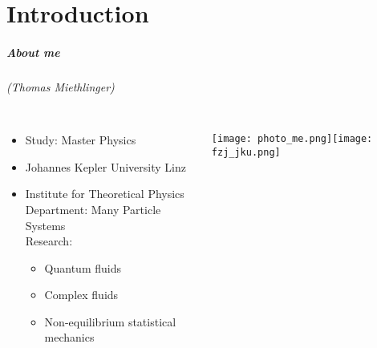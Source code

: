 








\part{Introduction}
\makepart

\begin{frame}
\frametitle{About me}
\framesubtitle{(Thomas Miethlinger)}
\begin{columns}[T]
 \begin{column}{.35\textwidth}
 \begin{itemize}
  \item Study: Master Physics
  \item Johannes Kepler University Linz
  \item Institute for Theoretical Physics \\ Department: Many Particle Systems \\
        Research:
        \begin{itemize}
         \item Quantum fluids
         \item Complex fluids
         \item Non-equilibrium statistical mechanics
        \end{itemize}
\end{itemize}
 \end{column}
 \hfill
 \begin{column}{.65\textwidth}
 \texttt{[image: photo\_me.png]}\texttt{[image: fzj\_jku.png]}
 \end{column}
\end{columns}
\end{frame}

